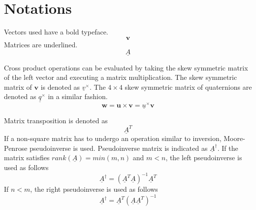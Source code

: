 \section*{Notations}

Vectors used have a bold typeface.  
\begin{equation*}
\textbf{v}
\end{equation*}
Matrices are underlined.
\begin{equation*}
\underline{A}
\end{equation*}

Cross product operations can be evaluated by taking the skew symmetric matrix of the left vector and executing a matrix multiplication. The skew symmetric matrix of $\textbf{v}$ is denoted as $\underline{v}^\times$. The $4\times4$ skew symmetric matrix of quaternions are denoted as $\underline{q}^\times$ in a similar fashion.
\begin{equation*}
	\textbf{w} = \textbf{u} \times \textbf{v} = \underline{u}^\times \textbf{v}
\end{equation*}

Matrix transposition is denoted as
\begin{equation*}
\underline{A}^T
\end{equation*}
If a non-square matrix has to undergo an operation similar to inversion, Moore-Penrose pseudoinverse is used. Pseudoinverse matrix is indicated as $\underline{A}^\dagger$. If the matrix satisfies $rank(\underline{A}) = min(m,n)$ and $m < n$, the left pseudoinverse is used as follows
\begin{equation*}
\underline{A}^\dagger    =   (\underline{A}^T \underline{A} )^{-1} \underline{A}^T 
\end{equation*}
If $n < m$, the right pseudoinverse is used as follows
\begin{equation*}
 \underline{A}^\dagger    =  \underline{A}^T  (\underline{A} \underline{A}^T)^{-1}
\end{equation*}

